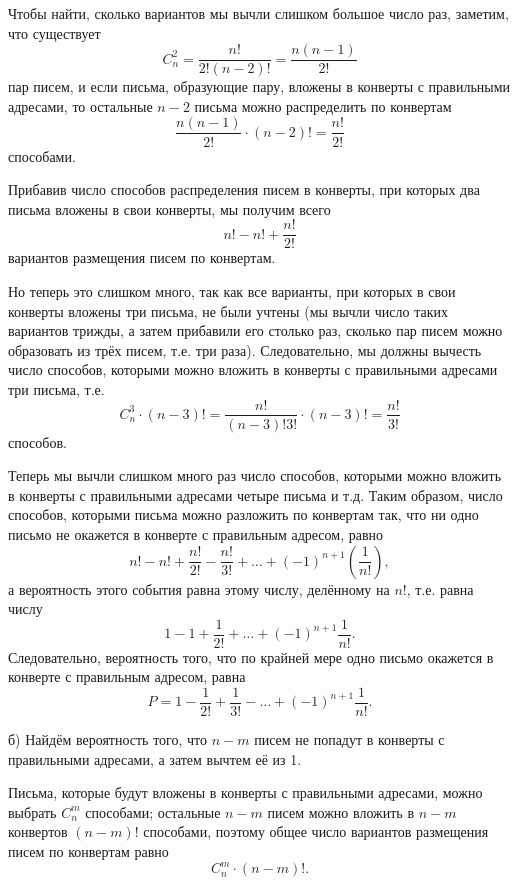 \documentclass{book}
\begin{document}
Чтобы найти, сколько вариантов мы вычли слишком большое число раз, заметим, что существует 
$$C_n^2 =
\frac{n!}{2! \left( n-2 \right)!} =
\frac{n \left( n-1 \right) }{2!}$$
пар писем, и если письма, образующие пару, вложены в конверты с правильными адресами, то остальные $n - 2$ письма можно распределить по конвертам
$$\frac{n \left( n-1 \right)}{2!} \cdot \left( n-2 \right)! =
\frac{n!}{2!}$$
способами.

Прибавив число способов распределения писем в конверты, при которых два письма вложены в свои конверты, мы получим всего
$$n! - n! + \frac{n!}{2!}$$
вариантов размещения писем по конвертам.

Но теперь это слишком много,
так как все варианты, при которых в свои конверты вложены три письма, не были учтены
(мы вычли число таких вариантов трижды, а затем прибавили его столько раз,
сколько пар писем можно образовать из трёх писем, т.е. три раза).
Следовательно, мы должны вычесть число способов, которыми можно вложить в конверты с правильными адресами три письма, т.е.
$$C_n^3 \cdot \left( n-3 \right)! =
\frac{n!}{\left( n-3 \right)! 3!}\cdot \left( n-3 \right)! =
\frac{n!}{3!}$$
способов.

Теперь мы вычли слишком много раз число способов,
которыми можно вложить в конверты с правильными адресами четыре письма и т.д.
Таким образом, число способов, которыми письма можно разложить по конвертам так, что ни одно письмо не окажется в конверте с правильным адресом, равно
$$n! - n! + \frac{n!}{2!} - \frac{n!}{3!} + \dotsc + \left( -1 \right)^{n+1} \left( \frac{1}{n!} \right),$$
а вероятность этого события равна этому числу, делённому на $n!$, т.е. равна числу
$$1 - 1 + \frac{1}{2!} + \dotsc + \left( -1 \right)^{n+1} \frac{1}{n!}.$$
Следовательно, вероятность того, что по крайней мере одно письмо окажется в конверте с правильным адресом, равна
$$P =
1 - \frac{1}{2!} + \frac{1}{3!} - \dotsc + \left( -1 \right)^{n+1} \frac{1}{n!}.$$

б) Найдём вероятность того, что $n - m$ писем не попадут в конверты с правильными адресами, а затем вычтем её из 1.

Письма, которые будут вложены в конверты с правильными адресами,
можно выбрать $C_n^m$ способами;
остальные $n - m$ писем можно вложить в $n - m$ конвертов $ \left( n-m \right)!$ способами,
поэтому общее число вариантов размещения писем по конвертам равно $$C_n^m \cdot \left( n-m \right)!.$$
\end{document}
